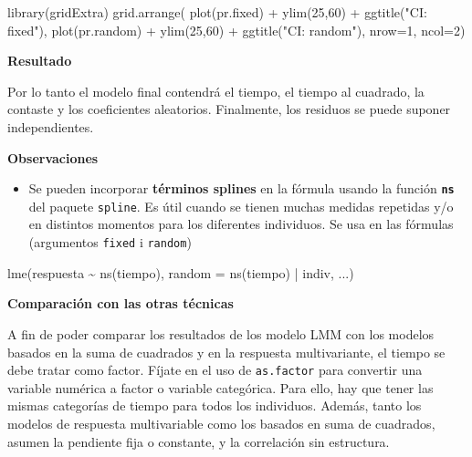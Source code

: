 \documentclass[
]{book}
\newenvironment{Shaded}{\begin{snugshade}}{\end{snugshade}}
\newcommand{\AttributeTok}[1]{\textcolor[rgb]{0.77,0.63,0.00}{#1}}
\newcommand{\DecValTok}[1]{\textcolor[rgb]{0.00,0.00,0.81}{#1}}
\newcommand{\FunctionTok}[1]{\textcolor[rgb]{0.00,0.00,0.00}{#1}}
\newcommand{\NormalTok}[1]{#1}
\newcommand{\SpecialCharTok}[1]{\textcolor[rgb]{0.00,0.00,0.00}{#1}}
\newcommand{\StringTok}[1]{\textcolor[rgb]{0.31,0.60,0.02}{#1}}
\providecommand{\tightlist}{%
  \setlength{\itemsep}{0pt}\setlength{\parskip}{0pt}}
\begin{document}
\begin{Shaded}
\begin{Highlighting}[]
\FunctionTok{library}\NormalTok{(gridExtra)}
\FunctionTok{grid.arrange}\NormalTok{(}
    \FunctionTok{plot}\NormalTok{(pr.fixed) }\SpecialCharTok{+} \FunctionTok{ylim}\NormalTok{(}\DecValTok{25}\NormalTok{,}\DecValTok{60}\NormalTok{) }\SpecialCharTok{+} \FunctionTok{ggtitle}\NormalTok{(}\StringTok{"CI: fixed"}\NormalTok{),}
    \FunctionTok{plot}\NormalTok{(pr.random) }\SpecialCharTok{+} \FunctionTok{ylim}\NormalTok{(}\DecValTok{25}\NormalTok{,}\DecValTok{60}\NormalTok{) }\SpecialCharTok{+} \FunctionTok{ggtitle}\NormalTok{(}\StringTok{"CI: random"}\NormalTok{),}
\AttributeTok{nrow=}\DecValTok{1}\NormalTok{, }\AttributeTok{ncol=}\DecValTok{2}\NormalTok{)}
\end{Highlighting}
\end{Shaded}

\textbf{Resultado}

Por lo tanto el modelo final contendrá el tiempo, el tiempo al cuadrado, la contaste y los coeficientes aleatorios. Finalmente, los residuos se puede suponer independientes.

\textbf{Observaciones}

\begin{itemize}
\tightlist
\item
  Se pueden incorporar \textbf{términos splines} en la fórmula usando la función \textbf{\texttt{ns}} del paquete \texttt{spline}. Es útil cuando se tienen muchas medidas repetidas y/o en distintos momentos para los diferentes individuos. Se usa en las fórmulas (argumentos \texttt{fixed} i \texttt{random})
\end{itemize}

\begin{Shaded}
\begin{Highlighting}[]
\FunctionTok{lme}\NormalTok{(respuesta }\SpecialCharTok{\textasciitilde{}} \FunctionTok{ns}\NormalTok{(tiempo), }\AttributeTok{random =} \FunctionTok{ns}\NormalTok{(tiempo) }\SpecialCharTok{|}\NormalTok{ indiv, ...)}
\end{Highlighting}
\end{Shaded}

\textbf{Comparación con las otras técnicas}

A fin de poder comparar los resultados de los modelo LMM con los modelos basados en la suma de cuadrados y en la respuesta multivariante, el tiempo se debe tratar como factor. Fíjate en el uso de \texttt{as.factor} para convertir una variable numérica a factor o variable categórica. Para ello, hay que tener las mismas categorías de tiempo para todos los individuos. Además, tanto los modelos de respuesta multivariable como los basados en suma de cuadrados, asumen la pendiente fija o constante, y la correlación sin estructura.
\end{document}
